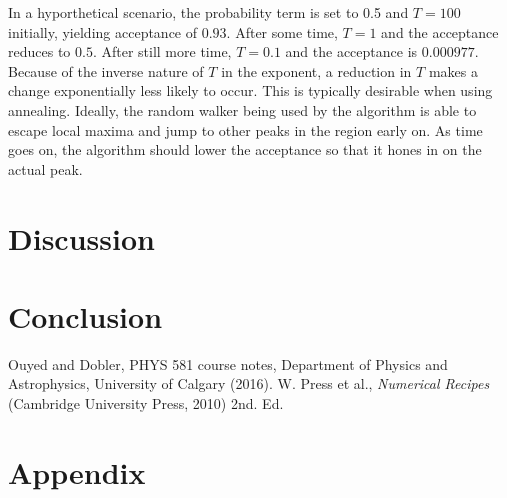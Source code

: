\documentclass[twocolumn]{article}
\begin{document}
In a hyporthetical scenario, the probability term is set to 0.5 and $T=100$ initially, yielding acceptance of $0.93$. After some time, $T=1$ and the acceptance reduces to $0.5$. After still more time, $T=0.1$ and the acceptance is $0.000977$. Because of the inverse nature of $T$ in the exponent, a reduction in $T$ makes a change exponentially less likely to occur. This is typically desirable when using annealing. Ideally, the random walker being used by the algorithm is able to escape local maxima and jump to other peaks in the region early on. As time goes on, the algorithm should lower the acceptance so that it hones in on the actual peak.


\section{Discussion}


\section{Conclusion}

\begin{thebibliography}{00}
	Ouyed and Dobler, PHYS 581 course notes, Department of Physics and Astrophysics, University of Calgary (2016).
	W. Press et al., \emph{Numerical Recipes} (Cambridge University Press, 2010) 2nd. Ed.
\end{thebibliography}

\section{Appendix}

	
\end{document}
